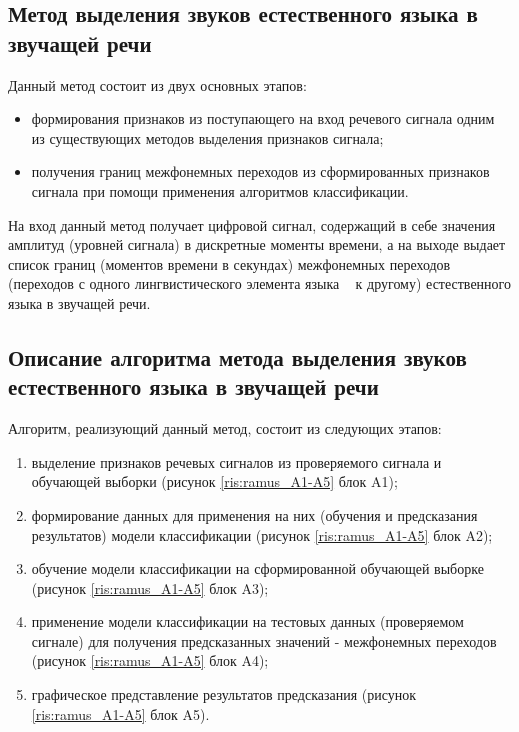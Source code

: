 \documentclass[utf8x, 14pt, oneside, a4paper]{article}
\begin{document}
	\subsection{Метод выделения звуков естественного языка в звучащей речи}
	
	Данный метод состоит из двух основных этапов:
	
	\begin{itemize}
		\item формирования признаков из поступающего на вход речевого сигнала одним из существующих методов выделения признаков сигнала;
		\item получения границ межфонемных переходов из сформированных признаков сигнала при помощи применения алгоритмов классификации.
	\end{itemize}

	На вход данный метод получает цифровой сигнал, содержащий в себе значения амплитуд (уровней сигнала) в дискретные моменты времени, а на выходе выдает список границ (моментов времени в секундах) межфонемных переходов (переходов с одного лингвистического элемента языка ~\cite{ling_elem} к другому) естественного языка в звучащей речи.
	
	\subsection{Описание алгоритма метода выделения звуков естественного \linebreak языка в звучащей речи}
	
	Алгоритм, реализующий данный метод, состоит из следующих этапов:
	
	\begin{enumerate}
		\item выделение признаков речевых сигналов из проверяемого сигнала и обучающей выборки (рисунок \ref{ris:ramus_A1-A5} блок A1);
		\item формирование данных для применения на них (обучения и предсказания результатов) модели классификации (рисунок \ref{ris:ramus_A1-A5} блок A2);
		\item обучение модели классификации на сформированной обучающей выборке (рисунок \ref{ris:ramus_A1-A5} блок A3);
		\item применение модели классификации на тестовых данных (проверяемом сигнале) для получения предсказанных значений - межфонемных переходов (рисунок \ref{ris:ramus_A1-A5} блок A4);
		\item графическое представление результатов предсказания (рисунок \ref{ris:ramus_A1-A5} блок A5).
	\end{enumerate}
	
\end{document}
